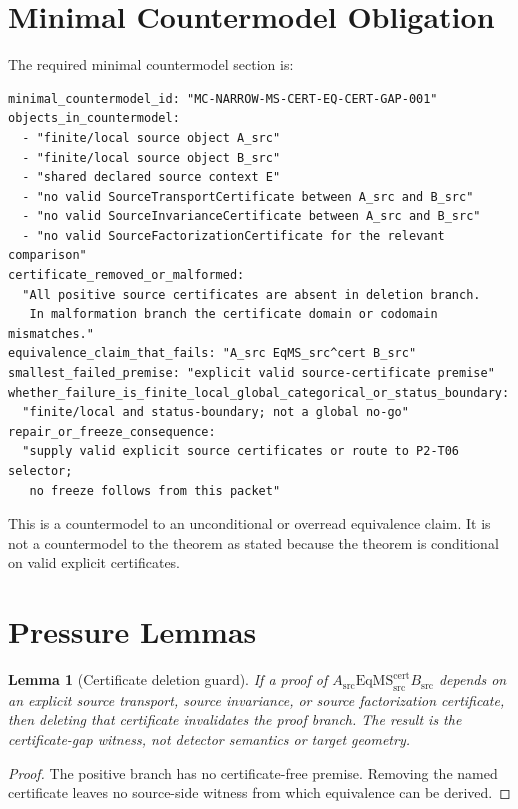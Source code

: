 \documentclass[11pt]{article}
\newcommand{\EqMScert}{\mathrm{EqMS}^{\mathrm{cert}}_{\mathrm{src}}}
\newcommand{\Asrc}{A_{\mathrm{src}}}
\newcommand{\Bsrc}{B_{\mathrm{src}}}
\newtheorem{lemma}{Lemma}
\begin{document}
\section{Minimal Countermodel Obligation}

The required minimal countermodel section is:

\begin{verbatim}
minimal_countermodel_id: "MC-NARROW-MS-CERT-EQ-CERT-GAP-001"
objects_in_countermodel:
  - "finite/local source object A_src"
  - "finite/local source object B_src"
  - "shared declared source context E"
  - "no valid SourceTransportCertificate between A_src and B_src"
  - "no valid SourceInvarianceCertificate between A_src and B_src"
  - "no valid SourceFactorizationCertificate for the relevant comparison"
certificate_removed_or_malformed:
  "All positive source certificates are absent in deletion branch.
   In malformation branch the certificate domain or codomain mismatches."
equivalence_claim_that_fails: "A_src EqMS_src^cert B_src"
smallest_failed_premise: "explicit valid source-certificate premise"
whether_failure_is_finite_local_global_categorical_or_status_boundary:
  "finite/local and status-boundary; not a global no-go"
repair_or_freeze_consequence:
  "supply valid explicit source certificates or route to P2-T06 selector;
   no freeze follows from this packet"
\end{verbatim}

This is a countermodel to an unconditional or overread equivalence claim. It is
not a countermodel to the theorem as stated because the theorem is conditional
on valid explicit certificates.

\section{Pressure Lemmas}

\begin{lemma}[Certificate deletion guard]
If a proof of \(\Asrc \EqMScert \Bsrc\) depends on an explicit source
transport, source invariance, or source factorization certificate, then
deleting that certificate invalidates the proof branch. The result is the
certificate-gap witness, not detector semantics or target geometry.
\end{lemma}

\begin{proof}
The positive branch has no certificate-free premise. Removing the named
certificate leaves no source-side witness from which equivalence can be
derived.
\end{proof}
\end{document}
